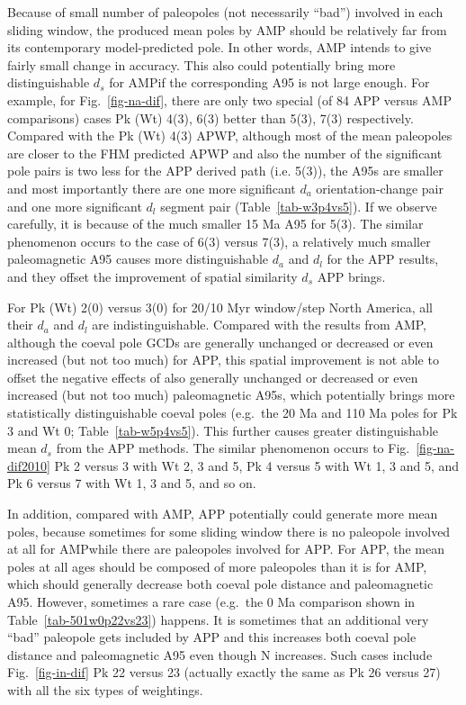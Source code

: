 Because of small number of paleopoles (not necessarily ``bad'') involved in
each sliding window, the produced mean poles by AMP should be relatively far
from its contemporary model-predicted pole. In other words, AMP intends to give
fairly small change in accuracy. This also could potentially bring more
distinguishable $d_s$ for AMP\@ if the corresponding A95 is not large enough.
For example, for Fig.~\ref{fig-na-dif}, there are only two special (of 84 APP
versus AMP comparisons) cases Pk (Wt) 4(3), 6(3) better than 5(3), 7(3)
respectively. Compared with the Pk (Wt) 4(3) APWP, although most of the mean
paleopoles are closer to the FHM predicted APWP and also the number of the
significant pole pairs is two less for the APP derived path (i.e. 5(3)), the A95s
are smaller and most importantly there are one more significant $d_a$
orientation-change pair and one more significant $d_l$ segment pair
(Table~\ref{tab-w3p4vs5}). If we observe carefully, it is because of the much
smaller 15 Ma A95 for 5(3). The similar phenomenon occurs to the case of 6(3)
versus 7(3), a relatively much smaller paleomagnetic A95 causes more distinguishable
$d_a$ and $d_l$ for the APP results, and they offset the improvement of spatial
similarity $d_s$ APP brings.

For Pk (Wt) 2(0) versus 3(0) for 20/10 Myr window/step North America, all their $d_a$ and
$d_l$ are indistinguishable. Compared with the results from AMP, although the
coeval pole GCDs are generally unchanged or decreased or even increased (but not
too much) for APP, this spatial improvement is not able to offset the negative
effects of also generally unchanged or decreased or even increased (but not too
much) paleomagnetic A95s, which potentially brings more statistically
distinguishable coeval poles (e.g.\ the 20 Ma and 110 Ma poles for Pk 3 and
Wt 0; Table~\ref{tab-w5p4vs5}). This further causes greater
distinguishable mean $d_s$ from the APP methods. The similar phenomenon occurs
to Fig.~\ref{fig-na-dif2010} Pk 2 versus 3 with Wt 2, 3 and 5, Pk
4 versus 5 with Wt 1, 3 and 5, and Pk 6 versus 7 with Wt 1, 3 and 5, and
so on.

In addition, compared with AMP, APP potentially could generate more mean poles,
because sometimes for some sliding window there is no paleopole involved at all
for AMP\@ while there are paleopoles involved for APP\@. For APP, the
mean poles at all ages should be composed of more paleopoles than it is for
AMP, which should generally decrease both coeval pole distance and paleomagnetic
A95. However, sometimes a rare case (e.g.\ the 0 Ma comparison shown in
Table~\ref{tab-501w0p22vs23}) happens. It is sometimes that an additional
very ``bad'' paleopole gets included by APP and this increases both coeval pole
distance and paleomagnetic A95 even though N increases. Such cases include
Fig.~\ref{fig-in-dif} Pk 22 versus 23 (actually exactly the same as Pk 26
versus 27) with all the six types of weightings.

